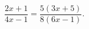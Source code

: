 \begin{ex}[type=equation]
	\begin{condition}
		$\dfrac{2x + 1}{4x - 1} = \dfrac{5(3x + 5)}{8(6x - 1)}.$
	\end{condition}
\end{ex}